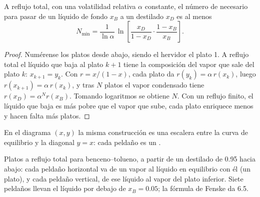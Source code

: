 \begin{proposition}\label{prop:b2:liquid-vapour-diagrams:fenske}
A reflujo total, con una volatilidad relativa $\alpha$ constante, el número de
 necesario para pasar de un líquido de fondo $x_B$ a un destilado
$x_D$ es al menos
\[
  N_{\min} = \frac{1}{\ln\alpha}\,\ln\!\left[\frac{x_D}{1 - x_D}\cdot\frac{1 - x_B}{x_B}\right] .
\]
\end{proposition}

\begin{proof}
Numérense los platos desde abajo, siendo el hervidor el plato 1. A reflujo total
el líquido que baja al plato $k + 1$ tiene la composición del vapor
que sale del plato $k$: $x_{k+1} = y_k$. Con $r = x/(1 - x)$, cada plato da
$r(y_k) = \alpha\,r(x_k)$, luego $r(x_{k+1}) = \alpha\,r(x_k)$, y tras $N$
platos el vapor condensado tiene $r(x_D) = \alpha^N r(x_B)$. Tomando logaritmos
se obtiene $N$. Con un reflujo finito, el líquido que baja es más pobre que el
vapor que sube, cada plato enriquece menos y hacen falta más platos.
\end{proof}

En el diagrama $(x, y)$ la misma construcción es una escalera entre la
curva de equilibrio y la diagonal $y = x$: cada peldaño es un .

\begin{omfigure}

{\small Platos a reflujo total para benceno--tolueno, a partir de un destilado de
0.95 hacia abajo: cada peldaño horizontal va de un vapor al líquido en
equilibrio con él (un plato), y cada peldaño vertical, de ese líquido al
vapor del plato inferior. Siete peldaños llevan el líquido por debajo de $x_B = 0.05$;
la fórmula de Fenske da 6.5.}
\end{omfigure}

